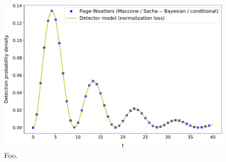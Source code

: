 
\begin{figure}[h!]
  \centering
  \includegraphics[width=\textwidth]{img/3ldetect/conditionalProbFit.pdf}
  \caption{Foo.}
\end{figure}